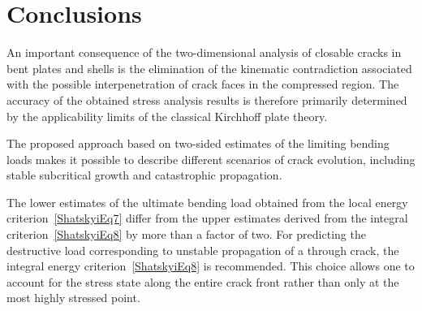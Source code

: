 \section{Conclusions}

An important consequence of the two-dimensional analysis of closable cracks in bent plates and shells is the elimination of the kinematic contradiction associated with the possible interpenetration of crack faces in the compressed region. The accuracy of the obtained stress analysis results is therefore primarily determined by the applicability limits of the classical Kirchhoff plate theory.

The proposed approach based on two-sided estimates of the limiting bending loads makes it possible to describe different scenarios of crack evolution, including stable subcritical growth and catastrophic propagation.

The lower estimates of the ultimate bending load obtained from the local energy criterion~\eqref{ShatskyiEq7} differ from the upper estimates derived from the integral criterion~\eqref{ShatskyiEq8} by more than a factor of two. For predicting the destructive load corresponding to unstable propagation of a through crack, the integral energy criterion~\eqref{ShatskyiEq8} is recommended. This choice allows one to account for the stress state along the entire crack front rather than only at the most highly stressed point.


